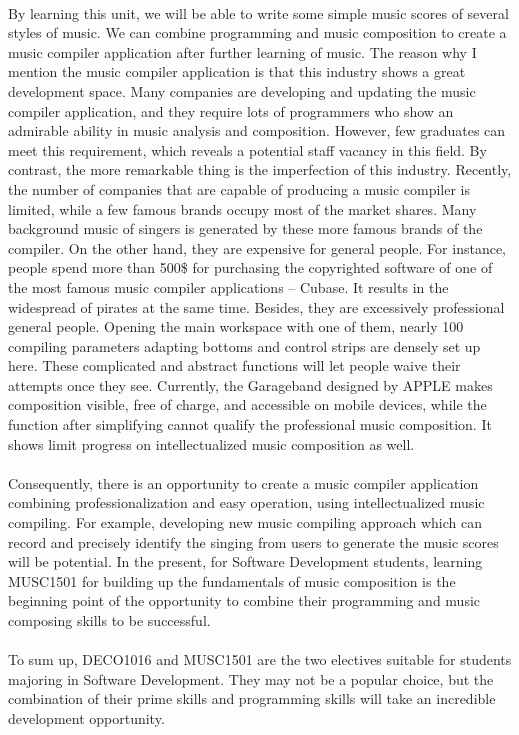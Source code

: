\documentclass{article}
\begin{document}
	\\
	By learning this unit, we will be able to write some simple music scores of several styles of music. We can combine programming and music composition to create a music compiler application after further learning of music. The reason why I mention the music compiler application is that this industry shows a great development space. Many companies are developing and updating the music compiler application, and they require lots of programmers who show an admirable ability in music analysis and composition. However, few graduates can meet this requirement, which reveals a potential staff vacancy in this field. By contrast, the more remarkable thing is the imperfection of this industry. Recently, the number of companies that are capable of producing a music compiler is limited, while a few famous brands occupy most of the market shares. Many background music of singers is generated by these more famous brands of the compiler. On the other hand, they are expensive for general people. For instance, people spend more than 500\$ for purchasing the copyrighted software of one of the most famous music compiler applications -- Cubase. It results in the widespread of pirates at the same time. Besides, they are excessively professional general people. Opening the main workspace with one of them, nearly 100 compiling parameters adapting bottoms and control strips are densely set up here. These complicated and abstract functions will let people waive their attempts once they see. Currently, the Garageband designed by APPLE makes composition visible, free of charge, and accessible on mobile devices, while the function after simplifying cannot qualify the professional music composition. It shows limit progress on intellectualized music composition as well.\\
	\\
	Consequently, there is an opportunity to create a music compiler application combining professionalization and easy operation, using intellectualized music compiling. For example, developing new music compiling approach which can record and precisely identify the singing from users to generate the music scores will be potential. In the present, for Software Development students, learning MUSC1501 for building up the fundamentals of music composition is the beginning point of the opportunity to combine their programming and music composing skills to be successful. \\
	\\
	To sum up, DECO1016 and MUSC1501 are the two electives suitable for students majoring in Software Development. They may not be a popular choice, but the combination of their prime skills and programming skills will take an incredible development opportunity.
	
\end{document}
